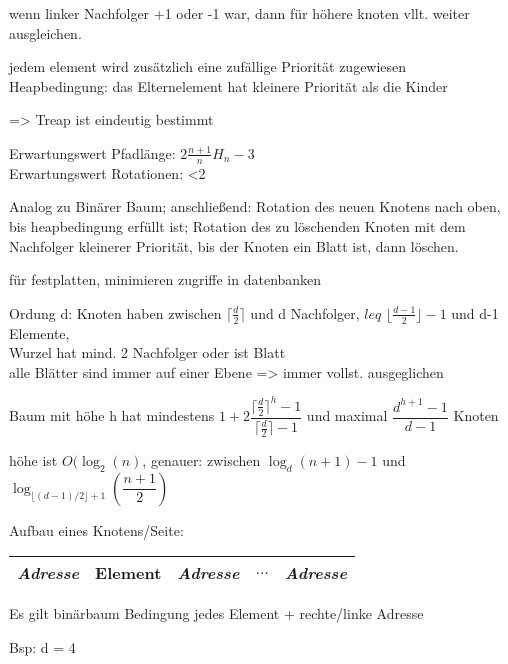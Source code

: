 wenn linker Nachfolger +1 oder -1 war, dann für höhere knoten vllt. weiter ausgleichen.





jedem element wird zusätzlich eine zufällige Priorität zugewiesen\\
Heapbedingung: das Elternelement hat kleinere Priorität als die Kinder

=> Treap ist eindeutig bestimmt

Erwartungswert Pfadlänge: $2\frac{n+1}{n}H_n-3$\\
Erwartungswert Rotationen: <2

Analog zu Binärer Baum; anschließend: Rotation des neuen Knotens nach oben, bis heapbedingung erfüllt ist;
Rotation des zu löschenden Knoten mit dem Nachfolger kleinerer Priorität, bis der Knoten ein Blatt ist, dann löschen.


\renewcommand{\min}{\lceil\frac{d}{2}\rceil}
\newcommand{\mincontent}{\lfloor\frac{d-1}{2}\rfloor}
für festplatten, minimieren zugriffe in datenbanken

Ordung d: Knoten haben zwischen $\min$ und d Nachfolger, $leq$ $\mincontent -1$ und d-1 Elemente,\\
Wurzel hat mind. 2 Nachfolger oder ist Blatt \\
alle Blätter sind immer auf einer Ebene => immer vollst. ausgeglichen 

Baum mit höhe h hat mindestens $1+2\dfrac{\min^h - 1}{\min -1}$ und maximal $ \dfrac{d^{h+1}-1}{d-1}$ Knoten

höhe ist $O(\log_2(n)$, genauer: zwischen $\log_d(n+1)-1$ und $\log_{\lfloor(d-1)/2\rfloor+1}\left(\dfrac{n+1}{2}\right)$

Aufbau eines Knotens/Seite:
\begin{tabular}{|c|c|c|c|c|}
\hline
\textit{Adresse} & Element & \textit{Adresse} & $\dots$ & \textit{Adresse}\\
\hline
\end{tabular}

Es gilt binärbaum Bedingung jedes Element + rechte/linke Adresse

Bsp: d = 4



